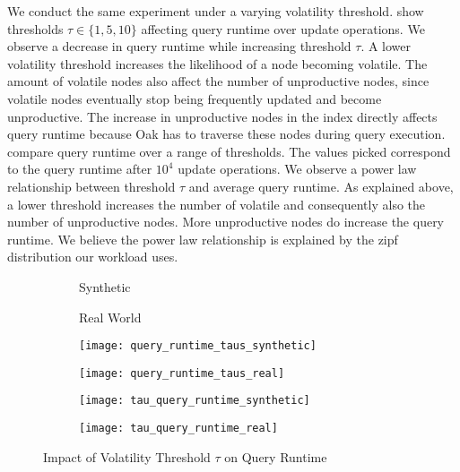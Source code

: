 \message{ !name(thesis.tex)}\documentclass[abstracton,12pt]{scrartcl}
\theoremstyle{definition}
\begin{document}
We conduct the same experiment under a varying volatility threshold. 
 show
thresholds $\tau \in \{1,5,10\}$ affecting query runtime
over update operations. We observe a decrease in query runtime
while increasing threshold $\tau$.
A lower volatility threshold increases the likelihood of a node
becoming volatile. The amount of volatile nodes also affect the number of
unproductive nodes, since volatile nodes eventually stop being frequently
updated and become unproductive. The increase in unproductive nodes in the index
directly affects query runtime because Oak has to traverse these nodes during
query execution.
 compare query
runtime over a range of thresholds. The values picked correspond to
the query runtime after $10^4$ update operations.
We observe a power law relationship between threshold $\tau$ and average query
runtime. As explained above, a lower threshold increases the number of volatile
and consequently also the number of unproductive nodes. More unproductive nodes
do increase the query runtime. We believe the power law relationship is
explained by the zipf distribution our workload uses. 

\begin{figure}
  \centering
  \begin{subfigure}{0.49\linewidth}
    \centering
    Synthetic
  \end{subfigure}
  \begin{subfigure}{0.49\linewidth}
    \centering
    Real World
  \end{subfigure}
  \begin{subfigure}{0.49\linewidth}
    \centering
    \texttt{[image: query\_runtime\_taus\_synthetic]}
    \caption{}
    \label{fig:query_runtime_taus_synthetic}
  \end{subfigure}
  \begin{subfigure}{0.49\linewidth}
    \centering
    \texttt{[image: query\_runtime\_taus\_real]}
    \caption{}
    \label{fig:query_runtime_taus_real}
  \end{subfigure}
  \begin{subfigure}{0.49\linewidth}
    \centering
    \texttt{[image: tau\_query\_runtime\_synthetic]}
    \caption{}
    \label{fig:tau_query_runtime_synthetic}
  \end{subfigure}
  \begin{subfigure}{0.49\linewidth}
    \centering
    \texttt{[image: tau\_query\_runtime\_real]}
    \caption{}
    \label{fig:tau_query_runtime_real}
  \end{subfigure}
\caption{Impact of Volatility Threshold $\tau$ on Query Runtime}
\end{figure}
\end{document}
